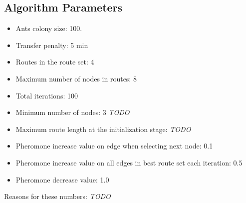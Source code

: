 \subsection{Algorithm Parameters}

\begin{itemize}
\item Ants colony size: 100.
\item Transfer penalty: 5 min
\item Routes in the route set: 4
\item Maximum number of nodes in routes: 8
\item Total iterations: 100
\item Minimum number of nodes: 3 \emph{\color{red} TODO}
\item Maximum route length at the initialization stage: \emph{\color{red} TODO}
\item Pheromone increase value on edge when selecting next node: 0.1
\item Pheromone increase value on all edges in best route set each iteration: 0.5
\item Pheromone decrease value: 1.0
\end{itemize}
Reasons for these numbers: \emph{\color{red} TODO}
